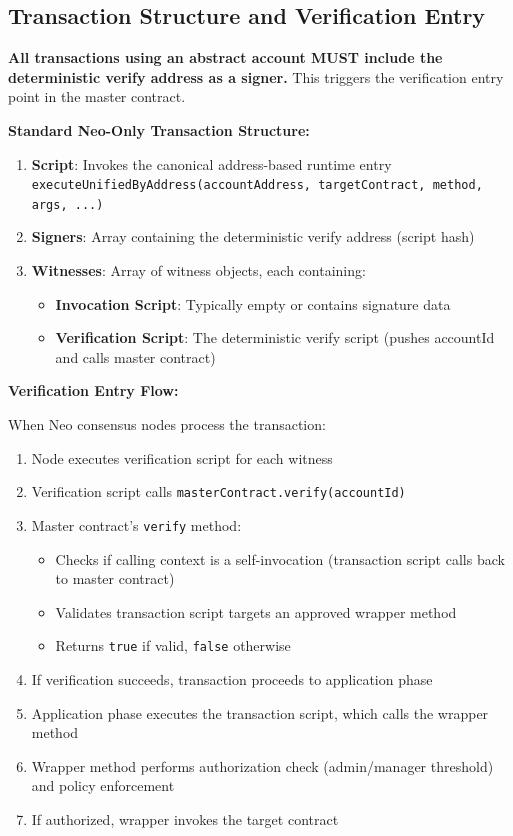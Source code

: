 \documentclass[10pt,twocolumn]{article}
\newcommand{\code}[1]{\texttt{\small #1}}
\begin{document}
{\subsection{Transaction Structure and Verification Entry}

\textbf{All transactions using an abstract account MUST include the deterministic verify address as a signer.} This triggers the verification entry point in the master contract.

\textbf{Standard Neo-Only Transaction Structure:}

\begin{enumerate}[leftmargin=*,topsep=2pt,itemsep=1pt]
\item \textbf{Script}: Invokes the canonical address-based runtime entry \code{executeUnifiedByAddress(accountAddress, targetContract, method, args, ...)}
\item \textbf{Signers}: Array containing the deterministic verify address (script hash)
\item \textbf{Witnesses}: Array of witness objects, each containing:
  \begin{itemize}[leftmargin=*,topsep=2pt,itemsep=1pt]
  \item \textbf{Invocation Script}: Typically empty or contains signature data
  \item \textbf{Verification Script}: The deterministic verify script (pushes accountId and calls master contract)
  \end{itemize}
\end{enumerate}

\textbf{Verification Entry Flow:}

When Neo consensus nodes process the transaction:
\begin{enumerate}[leftmargin=*,topsep=2pt,itemsep=1pt]
\item Node executes verification script for each witness
\item Verification script calls \code{masterContract.verify(accountId)}
\item Master contract's \code{verify} method:
  \begin{itemize}[leftmargin=*,topsep=2pt,itemsep=1pt]
  \item Checks if calling context is a self-invocation (transaction script calls back to master contract)
  \item Validates transaction script targets an approved wrapper method
  \item Returns \code{true} if valid, \code{false} otherwise
  \end{itemize}
\item If verification succeeds, transaction proceeds to application phase
\item Application phase executes the transaction script, which calls the wrapper method
\item Wrapper method performs authorization check (admin/manager threshold) and policy enforcement
\item If authorized, wrapper invokes the target contract
\end{enumerate}

}
\end{document}
